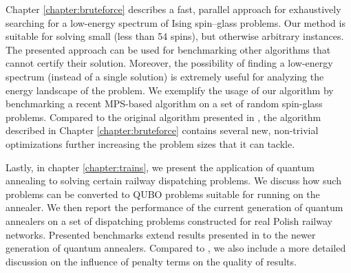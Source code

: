 Chapter \ref{chapter:bruteforce} describes a fast, parallel approach for
exhaustively searching for a low-energy spectrum of Ising spin--glass problems.
Our method is suitable for solving small (less than 54 spins), but otherwise
arbitrary instances. The presented approach can be used for benchmarking other
algorithms that cannot certify their solution. Moreover, the possibility of
finding a low-energy spectrum (instead of a single solution) is extremely
useful for analyzing the energy landscape of the problem. We exemplify the
usage of our algorithm by benchmarking a recent MPS-based algorithm on a set of
random spin-glass problems. Compared to the original algorithm presented in
\cite{bruteforce}, the algorithm described in Chapter \ref{chapter:bruteforce}
contains several new, non-trivial optimizations further increasing the problem
sizes that it can tackle.

Lastly, in chapter \ref{chapter:trains}, we present the application of quantum
annealing to solving certain railway dispatching problems. We discuss how such
problems can be converted to QUBO problems suitable for running on the
annealer. We then report the performance of the current generation of quantum
annealers on a set of dispatching problems constructed for real Polish railway
networks. Presented benchmarks extend results presented in \cite{trains} to the
newer generation of quantum annealers. Compared to \cite{trains}, we also
include a more detailed discussion on the influence of penalty terms on the
quality of results.
